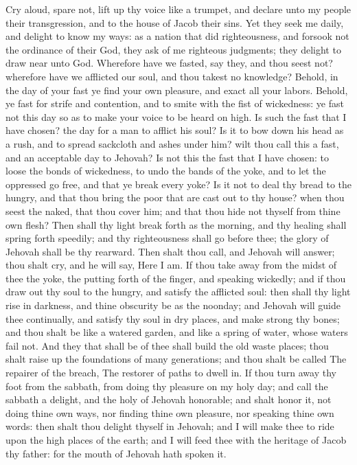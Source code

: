 Cry aloud, spare not, lift up thy voice like a trumpet, and declare unto my people their transgression, and to the house of Jacob their sins. Yet they seek me daily, and delight to know my ways: as a nation that did righteousness, and forsook not the ordinance of their God, they ask of me righteous judgments; they delight to draw near unto God. Wherefore have we fasted, say they, and thou seest not? wherefore have we afflicted our soul, and thou takest no knowledge? Behold, in the day of your fast ye find your own pleasure, and exact all your labors. Behold, ye fast for strife and contention, and to smite with the fist of wickedness: ye fast not this day so as to make your voice to be heard on high. Is such the fast that I have chosen? the day for a man to afflict his soul? Is it to bow down his head as a rush, and to spread sackcloth and ashes under him? wilt thou call this a fast, and an acceptable day to Jehovah? Is not this the fast that I have chosen: to loose the bonds of wickedness, to undo the bands of the yoke, and to let the oppressed go free, and that ye break every yoke? Is it not to deal thy bread to the hungry, and that thou bring the poor that are cast out to thy house? when thou seest the naked, that thou cover him; and that thou hide not thyself from thine own flesh? Then shall thy light break forth as the morning, and thy healing shall spring forth speedily; and thy righteousness shall go before thee; the glory of Jehovah shall be thy rearward. Then shalt thou call, and Jehovah will answer; thou shalt cry, and he will say, Here I am. If thou take away from the midst of thee the yoke, the putting forth of the finger, and speaking wickedly; and if thou draw out thy soul to the hungry, and satisfy the afflicted soul: then shall thy light rise in darkness, and thine obscurity be as the noonday; and Jehovah will guide thee continually, and satisfy thy soul in dry places, and make strong thy bones; and thou shalt be like a watered garden, and like a spring of water, whose waters fail not. And they that shall be of thee shall build the old waste places; thou shalt raise up the foundations of many generations; and thou shalt be called The repairer of the breach, The restorer of paths to dwell in.  If thou turn away thy foot from the sabbath, from doing thy pleasure on my holy day; and call the sabbath a delight, and the holy of Jehovah honorable; and shalt honor it, not doing thine own ways, nor finding thine own pleasure, nor speaking thine own words: then shalt thou delight thyself in Jehovah; and I will make thee to ride upon the high places of the earth; and I will feed thee with the heritage of Jacob thy father: for the mouth of Jehovah hath spoken it. 

